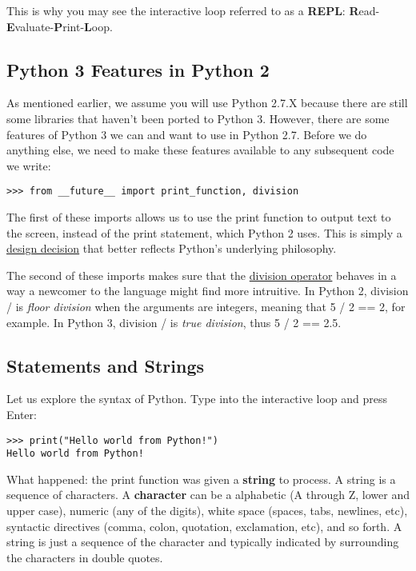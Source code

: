 This is why you may see the interactive loop referred to as a
\textbf{REPL}:
\textbf{R}ead-\textbf{E}valuate-\textbf{P}rint-\textbf{L}oop.

\subsection{Python 3 Features in Python
2}\label{python-3-features-in-python-2}

As mentioned earlier, we assume you will use Python 2.7.X because there
are still some libraries that haven't been ported to Python 3. However,
there are some features of Python 3 we can and want to use in Python
2.7. Before we do anything else, we need to make these features
available to any subsequent code we write:

\begin{verbatim}
>>> from __future__ import print_function, division
\end{verbatim}

The first of these imports allows us to use the print function to output
text to the screen, instead of the print statement, which Python 2 uses.
This is simply a \href{https://www.python.org/dev/peps/pep-3105/}{design
decision} that better reflects Python's underlying philosophy.

The second of these imports makes sure that the
\href{https://www.python.org/dev/peps/pep-0238/}{division operator}
behaves in a way a newcomer to the language might find more intruitive.
In Python 2, division / is \emph{floor division} when the arguments are
integers, meaning that 5 / 2 == 2, for example. In Python 3, division /
is \emph{true division}, thus 5 / 2 == 2.5.

\subsection{Statements and Strings}\label{statements-and-strings}

Let us explore the syntax of Python. Type into the interactive loop and
press Enter:

\begin{verbatim}
>>> print("Hello world from Python!")
Hello world from Python!
\end{verbatim}

What happened: the print function was given a \textbf{string} to
process. A string is a sequence of characters. A \textbf{character} can
be a alphabetic (A through Z, lower and upper case), numeric (any of the
digits), white space (spaces, tabs, newlines, etc), syntactic directives
(comma, colon, quotation, exclamation, etc), and so forth. A string is
just a sequence of the character and typically indicated by surrounding
the characters in double quotes.

